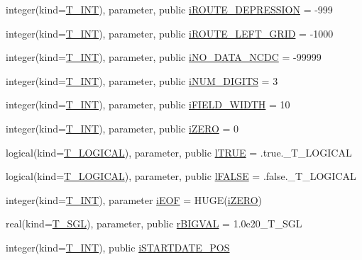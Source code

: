 \begin{DoxyCompactItemize}
\item 
integer(kind=\hyperlink{namespacetest_a6f91ebd89b58cfcc5da99faed9385c1e}{T\_\-INT}), parameter, public \hyperlink{namespacetest_a238a0131e776ca1d31fb18253d86fdbe}{iROUTE\_\-DEPRESSION} = -\/999
\item 
integer(kind=\hyperlink{namespacetest_a6f91ebd89b58cfcc5da99faed9385c1e}{T\_\-INT}), parameter, public \hyperlink{namespacetest_a828d11529416772ecac92d8ca31c2056}{iROUTE\_\-LEFT\_\-GRID} = -\/1000
\item 
integer(kind=\hyperlink{namespacetest_a6f91ebd89b58cfcc5da99faed9385c1e}{T\_\-INT}), parameter, public \hyperlink{namespacetest_a751d31358c9620f1549f1428a6a12835}{iNO\_\-DATA\_\-NCDC} = -\/99999
\item 
integer(kind=\hyperlink{namespacetest_a6f91ebd89b58cfcc5da99faed9385c1e}{T\_\-INT}), parameter, public \hyperlink{namespacetest_a9f880ad69dfceb22317f4bd514f70921}{iNUM\_\-DIGITS} = 3
\item 
integer(kind=\hyperlink{namespacetest_a6f91ebd89b58cfcc5da99faed9385c1e}{T\_\-INT}), parameter, public \hyperlink{namespacetest_a0255f32e18a217bf4bc1cc1ebf08a8ad}{iFIELD\_\-WIDTH} = 10
\item 
integer(kind=\hyperlink{namespacetest_a6f91ebd89b58cfcc5da99faed9385c1e}{T\_\-INT}), parameter, public \hyperlink{namespacetest_a3014c474a511a7853327d17f396fea73}{iZERO} = 0
\item 
logical(kind=\hyperlink{namespacetest_acdeac586276a7d1d394fb5eddc77fc3d}{T\_\-LOGICAL}), parameter, public \hyperlink{namespacetest_ab7046de13f01778d86667e4266521664}{lTRUE} = .true.\_\-T\_\-LOGICAL
\item 
logical(kind=\hyperlink{namespacetest_acdeac586276a7d1d394fb5eddc77fc3d}{T\_\-LOGICAL}), parameter, public \hyperlink{namespacetest_ad44869e0204417021792170cd610ee25}{lFALSE} = .false.\_\-T\_\-LOGICAL
\item 
integer(kind=\hyperlink{namespacetest_a6f91ebd89b58cfcc5da99faed9385c1e}{T\_\-INT}), parameter \hyperlink{namespacetest_a3d9d5da4779988c8ab638ff80ee1d75e}{iEOF} = HUGE(\hyperlink{namespacetest_a3014c474a511a7853327d17f396fea73}{iZERO})
\item 
real(kind=\hyperlink{namespacetest_a04d8b9090502de3a00046fe904bc3d99}{T\_\-SGL}), parameter, public \hyperlink{namespacetest_ac6f2875c79f3dc5f3058945c798787da}{rBIGVAL} = 1.0e20\_\-T\_\-SGL
\item 
integer(kind=\hyperlink{namespacetest_a6f91ebd89b58cfcc5da99faed9385c1e}{T\_\-INT}), public \hyperlink{namespacetest_ac53c64b203e8d99ae558218e98beef9d}{iSTARTDATE\_\-POS}

\end{DoxyCompactItemize}
